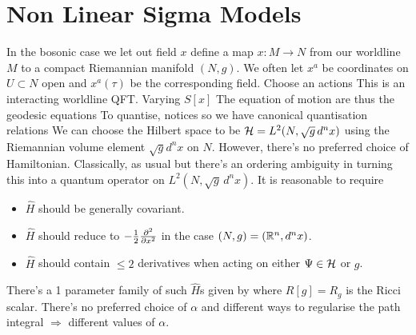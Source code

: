 \documentclass{article}
\begin{document}
\section{Non Linear Sigma Models}
In the bosonic case we let out field $x$ define a map $x:M\to N$ from our worldline $M$ to a compact Riemannian manifold $(N,g)$. We often let $x^a$ be coordinates on $U\subset N$ open and $x^a(\tau)$ be the corresponding field. Choose an actions 
This is an interacting worldline QFT. Varying $S[x]$
The equation of motion are thus the geodesic equations 
To quantise, notices 
so we have canonical quantisation relations 
We can choose the Hilbert space to be $\mathcal{H} = L^2(N, \sqrt{g} \, d^n x)$ using the Riemannian volume element $\sqrt{g} d^n x$ on $N$. However, there's no preferred choice of Hamiltonian. Classically, as usual
but there's an ordering ambiguity in turning this into a quantum operator on $L^2(N,\sqrt{g} \, d^n x)$. It is reasonable to require 
\begin{itemize}
    \item $\hat{H}$ should be generally covariant. 
    \item $\hat{H}$ should reduce to $-\frac{1}{2}\frac{\partial^2 }{\partial x^2}$ in the case $(N,g)=(\mathbb{R}^n,d^n x)$.
    \item $\hat{H}$ should contain $\leq 2$ derivatives when acting on either $\Psi\in\mathcal{H}$ or $g$. 
\end{itemize}
There's a 1 parameter family of such $\hat{H}$s given by 
where $R[g]=R_g$ is the Ricci scalar. There's no preferred choice of $\alpha$ and different ways to regularise the path integral $\Rightarrow$ different values of $\alpha$. 
\end{document}
